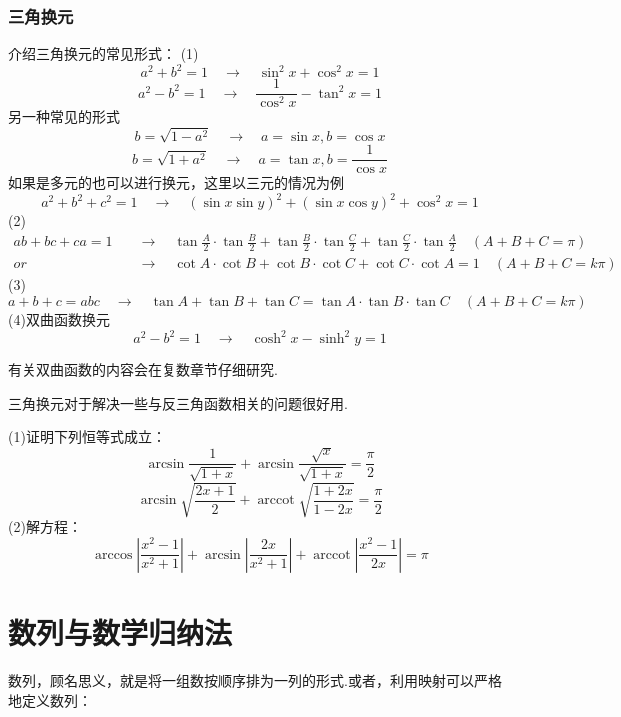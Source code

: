 \documentclass[lang=cn, zihao=5]{elegantbook}
\DeclareMathOperator{\arccot}{arccot}
\begin{document}
\subsection{三角换元}

介绍三角换元的常见形式：
    (1)
    $$a^2+b^2=1 \quad \longrightarrow \quad \sin^2{x}+\cos^2{x}=1$$
    $$a^2-b^2=1 \quad \longrightarrow \quad \frac{1}{\cos^2 x}-\tan^2 {x}=1$$
    另一种常见的形式
    $$b=\sqrt{1-a^2} \quad \longrightarrow \quad a=\sin{x} , b=\cos{x}$$
    $$b=\sqrt{1+a^2} \quad \longrightarrow \quad a=\tan{x} , b=\frac{1}{\cos{x}}$$
    如果是多元的也可以进行换元，这里以三元的情况为例
    $$a^2+b^2+c^2=1 \quad \longrightarrow \quad (\sin{x}\sin{y})^2+(\sin{x}\cos{y})^2+\cos^2{x}=1$$
    (2)
    \begin{align*}
        ab+bc+ca=1 \quad & \longrightarrow \quad \tan{\frac{A}{2}} \cdot \tan{\frac{B}{2}} + \tan{\frac{B}{2}} \cdot \tan{\frac{C}{2}} + \tan{\frac{C}{2}} \cdot \tan{\frac{A}{2}} \quad (A+B+C=\pi) \\
        or & \longrightarrow \quad \cot{A} \cdot \cot{B} + \cot{B} \cdot \cot{C} + \cot{C} \cdot \cot{A} = 1 \quad (A+B+C=k\pi)
    \end{align*}
    (3)$$a+b+c=abc \quad \longrightarrow \quad \tan{A}+\tan{B}+\tan{C}=\tan{A} \cdot \tan{B} \cdot \tan{C} \quad (A+B+C=k\pi)$$
    (4)双曲函数换元
    $$a^2-b^2=1 \quad \longrightarrow \quad \cosh^2{x}-\sinh^2{y}=1$$

\begin{remark}
	有关双曲函数的内容会在复数章节仔细研究.
\end{remark}

三角换元对于解决一些与反三角函数相关的问题很好用.

\begin{example}
	(1)证明下列恒等式成立：
	$$\arcsin \frac{1}{\sqrt{1+x}} + \arcsin \frac{\sqrt{x}}{\sqrt{1+x}} = \frac{\pi}{2}$$
	$$\arcsin \sqrt{\frac{2x+1}{2}} + \arccot \sqrt{\frac{1+2x}{1-2x}} = \frac{\pi}{2}$$
	(2)解方程：$$\arccos \left| \frac{x^2-1}{x^2+1} \right| + \arcsin \left| \frac{2x}{x^2+1} \right| + \arccot \left| \frac{x^2-1}{2x} \right| = \pi$$
\end{example}



\chapter{数列与数学归纳法}

数列，顾名思义，就是将一组数按顺序排为一列的形式.或者，利用映射可以严格地定义数列：
\end{document}
